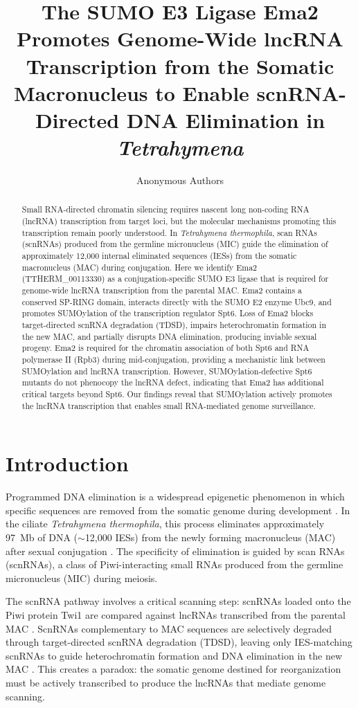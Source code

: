 \documentclass[11pt]{article}
\title{The SUMO E3 Ligase Ema2 Promotes Genome-Wide lncRNA Transcription from the Somatic Macronucleus to Enable scnRNA-Directed DNA Elimination in \textit{Tetrahymena}}
\author{Anonymous Authors}
\date{}
\begin{document}
\maketitle

\begin{abstract}
Small RNA-directed chromatin silencing requires nascent long non-coding RNA (lncRNA) transcription from target loci, but the molecular mechanisms promoting this transcription remain poorly understood. In \textit{Tetrahymena thermophila}, scan RNAs (scnRNAs) produced from the germline micronucleus (MIC) guide the elimination of approximately 12,000 internal eliminated sequences (IESs) from the somatic macronucleus (MAC) during conjugation. Here we identify Ema2 (TTHERM\_00113330) as a conjugation-specific SUMO E3 ligase that is required for genome-wide lncRNA transcription from the parental MAC. Ema2 contains a conserved SP-RING domain, interacts directly with the SUMO E2 enzyme Ubc9, and promotes SUMOylation of the transcription regulator Spt6. Loss of Ema2 blocks target-directed scnRNA degradation (TDSD), impairs heterochromatin formation in the new MAC, and partially disrupts DNA elimination, producing inviable sexual progeny. Ema2 is required for the chromatin association of both Spt6 and RNA polymerase II (Rpb3) during mid-conjugation, providing a mechanistic link between SUMOylation and lncRNA transcription. However, SUMOylation-defective Spt6 mutants do not phenocopy the lncRNA defect, indicating that Ema2 has additional critical targets beyond Spt6. Our findings reveal that SUMOylation actively promotes the lncRNA transcription that enables small RNA-mediated genome surveillance.
\end{abstract}

\section{Introduction}

Programmed DNA elimination is a widespread epigenetic phenomenon in which specific sequences are removed from the somatic genome during development \citep{yao1984programmed}. In the ciliate \textit{Tetrahymena thermophila}, this process eliminates approximately 97~Mb of DNA ($\sim$12,000 IESs) from the newly forming macronucleus (MAC) after sexual conjugation \citep{mochizuki2002analysis}. The specificity of elimination is guided by scan RNAs (scnRNAs), a class of Piwi-interacting small RNAs produced from the germline micronucleus (MIC) during meiosis.

The scnRNA pathway involves a critical scanning step: scnRNAs loaded onto the Piwi protein Twi1 are compared against lncRNAs transcribed from the parental MAC \citep{aronica2008studying}. ScnRNAs complementary to MAC sequences are selectively degraded through target-directed scnRNA degradation (TDSD), leaving only IES-matching scnRNAs to guide heterochromatin formation and DNA elimination in the new MAC \citep{noto2015tetrahymena}. This creates a paradox: the somatic genome destined for reorganization must be actively transcribed to produce the lncRNAs that mediate genome scanning.
\end{document}
